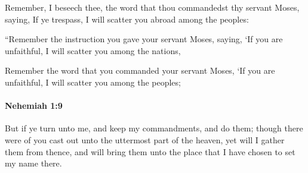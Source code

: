 			\begin{versebox}
					\item[BHS] 
					\item[LXX] 
					\item[ASV] Remember, I beseech thee, the word that thou commandedst thy servant Moses, saying, If ye trespass, I will scatter you abroad among the peoples:
					\item[NIV] “Remember the instruction you gave your servant Moses, saying, ‘If you are unfaithful, I will scatter you among the nations,
					\item[NRSV] Remember the word that you commanded your servant Moses, ‘If you are unfaithful, I will scatter you among the peoples;
			\end{versebox}

		\paragraph{Nehemiah 1:9} %
			\label{NEHEMIAH-1-9}

			But if ye turn unto me, and keep my commandments, and do them; though there were of you cast out unto the uttermost part of the heaven, yet will I gather them from thence, and will bring them unto the place that I have chosen to set my name there.

